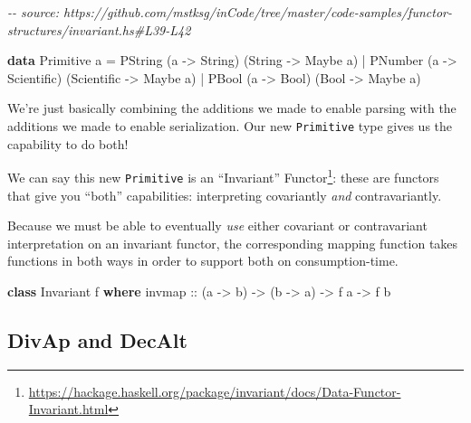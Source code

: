 \documentclass[]{article}
\newenvironment{Shaded}{}{}
\newcommand{\CommentTok}[1]{\textcolor[rgb]{0.38,0.63,0.69}{\textit{#1}}}
\newcommand{\DataTypeTok}[1]{\textcolor[rgb]{0.56,0.13,0.00}{#1}}
\newcommand{\KeywordTok}[1]{\textcolor[rgb]{0.00,0.44,0.13}{\textbf{#1}}}
\newcommand{\NormalTok}[1]{#1}
\newcommand{\OperatorTok}[1]{\textcolor[rgb]{0.40,0.40,0.40}{#1}}
\newcommand{\OtherTok}[1]{\textcolor[rgb]{0.00,0.44,0.13}{#1}}
\renewcommand{\href}[2]{#2\footnote{\url{#1}}}
\begin{document}
\begin{Shaded}
\begin{Highlighting}[]
\CommentTok{{-}{-} source: https://github.com/mstksg/inCode/tree/master/code{-}samples/functor{-}structures/invariant.hs\#L39{-}L42}

\KeywordTok{data} \DataTypeTok{Primitive}\NormalTok{ a }\OtherTok{=}
      \DataTypeTok{PString}\NormalTok{ (a }\OtherTok{{-}\textgreater{}} \DataTypeTok{String}\NormalTok{)     (}\DataTypeTok{String}     \OtherTok{{-}\textgreater{}} \DataTypeTok{Maybe}\NormalTok{ a)}
    \OperatorTok{|} \DataTypeTok{PNumber}\NormalTok{ (a }\OtherTok{{-}\textgreater{}} \DataTypeTok{Scientific}\NormalTok{) (}\DataTypeTok{Scientific} \OtherTok{{-}\textgreater{}} \DataTypeTok{Maybe}\NormalTok{ a)}
    \OperatorTok{|} \DataTypeTok{PBool}\NormalTok{   (a }\OtherTok{{-}\textgreater{}} \DataTypeTok{Bool}\NormalTok{)       (}\DataTypeTok{Bool}       \OtherTok{{-}\textgreater{}} \DataTypeTok{Maybe}\NormalTok{ a)}
\end{Highlighting}
\end{Shaded}

We're just basically combining the additions we made to enable parsing with the
additions we made to enable serialization. Our new \texttt{Primitive} type gives
us the capability to do both!

We can say this new \texttt{Primitive} is an
\href{https://hackage.haskell.org/package/invariant/docs/Data-Functor-Invariant.html}{``Invariant''
Functor}: these are functors that give you ``both'' capabilities: interpreting
covariantly \emph{and} contravariantly.

Because we must be able to eventually \emph{use} either covariant or
contravariant interpretation on an invariant functor, the corresponding mapping
function takes functions in both ways in order to support both on
consumption-time.

\begin{Shaded}
\begin{Highlighting}[]
\KeywordTok{class} \DataTypeTok{Invariant}\NormalTok{ f }\KeywordTok{where}
\OtherTok{    invmap ::}\NormalTok{ (a }\OtherTok{{-}\textgreater{}}\NormalTok{ b) }\OtherTok{{-}\textgreater{}}\NormalTok{ (b }\OtherTok{{-}\textgreater{}}\NormalTok{ a) }\OtherTok{{-}\textgreater{}}\NormalTok{ f a }\OtherTok{{-}\textgreater{}}\NormalTok{ f b}
\end{Highlighting}
\end{Shaded}

\subsection{DivAp and DecAlt}\label{divap-and-decalt}
\end{document}
